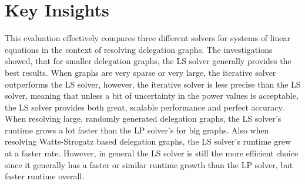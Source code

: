 \section{Key Insights}

This evaluation effectively compares three different solvers for systems of linear equations in the context of resolving delegation graphs. The investigations showed, that for smaller delegation graphs, the LS solver generally provides the best results. When graphs are very sparse or very large, the iterative solver outperforms the LS solver, however, the iterative solver is less precise than the LS solver, meaning that unless a bit of uncertainty in the power values is acceptable, the LS solver provides both great, scalable performance and perfect accuracy. When resolving large, randomly generated delegation graphs, the LS solver's runtime grows a lot faster than the LP solver's for big graphs. Also when resolving Watts-Strogatz based delegation graphs, the LS solver's runtime grew at a faster rate. However, in general the LS solver is still the more efficient choice since it generally has a faster or similar runtime growth than the LP solver, but faster runtime overall. 
